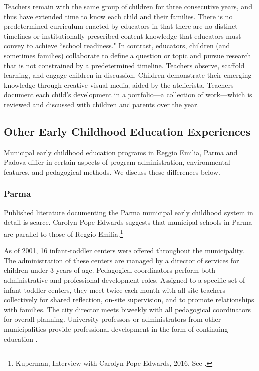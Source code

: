 Teachers remain with the same group of children for three consecutive years, and thus have extended time to know each child and their families. There is no predetermined curriculum enacted by educators in that there are no distinct timelines or institutionally-prescribed content knowledge that educators must convey to achieve ``school readiness." In contrast, educators, children (and sometimes families) collaborate to define a question or topic and pursue research that is not constrained by a predetermined timeline. Teachers observe, scaffold learning, and engage children in discussion. Children demonstrate their emerging knowledge through creative visual media, aided by the atelierista. Teachers document each child's development in a portfolio---a collection of work---which is reviewed and discussed with children and parents over the year. 

\subsection{Other Early Childhood Education Experiences}

Municipal early childhood education programs in Reggio Emilia, Parma and Padova differ in certain aspects of program administration, environmental features, and pedagogical methods. We discuss these differences below. 

\subsubsection{Parma}

Published literature documenting the Parma municipal early childhood system in detail is scarce. Carolyn Pope Edwards suggests that municipal schools in Parma are parallel to those of Reggio Emilia.\footnote{Kuperman, Interview with Carolyn Pope Edwards, 2016. See \citet{Edwards-etal-eds_1998_Hundred-Languages}.} 

As of 2001, 16 infant-toddler centers were offered throughout the municipality. The administration of these centers are managed by a director of services for children under 3 years of age. Pedagogical coordinators perform both administrative and professional development roles. Assigned to a specific set of infant-toddler centers, they meet twice each month with all site teachers collectively for shared reflection, on-site supervision, and to promote relationships with families. The city director meets biweekly with all pedagogical coordinators for overall planning. University professors or administrators from other municipalities provide professional development in the form of continuing education \citep{Terzi-Cantarelli_2001_Parma}.

